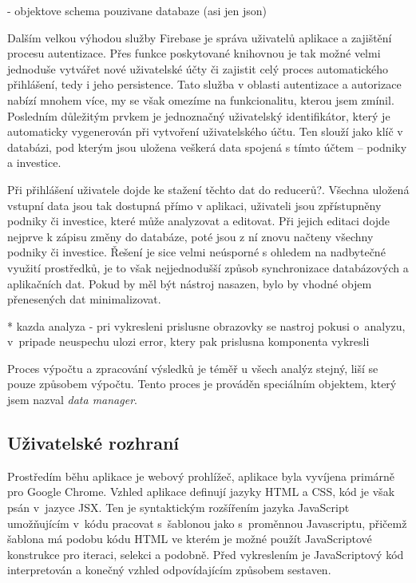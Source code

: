- objektove schema pouzivane databaze (asi jen json)

Dalším velkou výhodou služby Firebase je správa uživatelů aplikace a zajištění procesu autentizace. Přes funkce poskytované knihovnou je tak možné velmi jednoduše vytvářet nové uživatelské účty či zajistit celý proces automatického přihlášení, tedy i jeho persistence. Tato služba v oblasti autentizace a autorizace nabízí mnohem více, my se však omezíme na funkcionalitu, kterou jsem zmínil. Posledním důležitým prvkem je jednoznačný uživatelský identifikátor, který je automaticky vygenerován při vytvoření uživatelského účtu. Ten slouží jako klíč v databázi, pod kterým jsou uložena veškerá data spojená s tímto účtem -- podniky a investice. 

Při přihlášení uživatele dojde ke stažení těchto dat do reducerů?. Všechna uložená vstupní data jsou tak dostupná přímo v aplikaci, uživateli jsou zpřístupněny podniky či investice, které může analyzovat a editovat. Při jejich editaci dojde nejprve k zápisu změny do databáze, poté jsou z ní znovu načteny všechny podniky či investice. Řešení je sice velmi neúsporné s ohledem na nadbytečné využití prostředků, je to však nejjednodušší způsob synchronizace databázových a aplikačních dat. Pokud by měl být nástroj nasazen, bylo by vhodné objem přenesených dat minimalizovat. 

* kazda analyza - pri vykresleni prislusne obrazovky se nastroj pokusi o~analyzu, v~pripade neuspechu ulozi error, ktery pak prislusna komponenta vykresli

Proces výpočtu a zpracování výsledků je téměř u všech analýz stejný, liší se pouze způsobem výpočtu. Tento proces je prováděn speciálním objektem, který jsem nazval \textit{data manager}.

\subsection{Uživatelské rozhraní}

Prostředím běhu aplikace je webový prohlížeč, aplikace byla vyvíjena primárně pro Google Chrome. Vzhled aplikace definují jazyky HTML a CSS, kód je však psán v~jazyce JSX. Ten je syntaktickým rozšířením jazyka JavaScript umožňujícím v~kódu pracovat s~šablonou jako s~proměnnou Javascriptu, přičemž šablona má podobu kódu HTML ve kterém je možné použít JavaScriptové konstrukce pro iteraci, selekci a podobně. Před vykreslením je JavaScriptový kód interpretován a konečný vzhled odpovídajícím způsobem sestaven.

